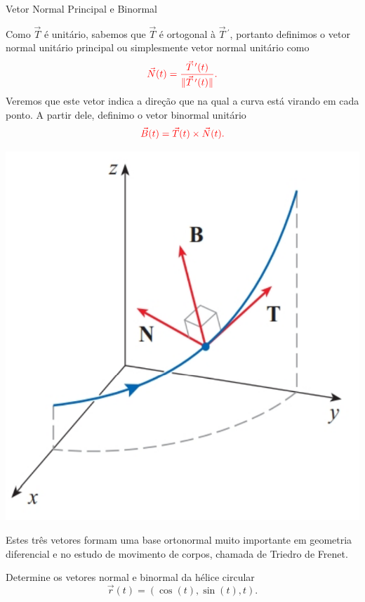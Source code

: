 \begin{frame}[label=fun-vet]{Vetor Normal Principal e Binormal}
\begin{minipage}{0.7\textwidth}
Como $\vec{T}$ é unitário, sabemos que $\vec{T}$ é ortogonal à  $\vec{T}\,^\prime$, portanto definimos o {\color{blue} vetor normal unitário principal} ou simplesmente  {\color{blue} vetor normal unitário} como 
\[\color{red} \vec{N}(t)=\frac{\vec{T}\,^\prime(t)}{\|\vec{T}\,^\prime(t)\|}.\]
Veremos que este vetor indica a direção que na qual a curva está virando em cada ponto. A partir dele, definimo o {\color{blue} vetor binormal unitário}
\[\color{red} \vec{B}(t)=\vec{T}(t)\times \vec{N}(t).\]
\end{minipage}
\begin{minipage}{0.25\textwidth}
\includegraphics[scale=0.2]{figuras/normal-binormal.png}
\end{minipage}
Estes três vetores formam uma base ortonormal muito importante em geometria diferencial e no estudo de movimento de corpos, chamada de {\color{blue} Triedro de Frenet}.

\end{frame}

\begin{frame}[label=fun-vet]
\begin{exe}
Determine os vetores normal e binormal da hélice circular $$\vec{r}(t)=(\cos(t),\sin(t),t).$$

\end{exe}
\end{frame}

